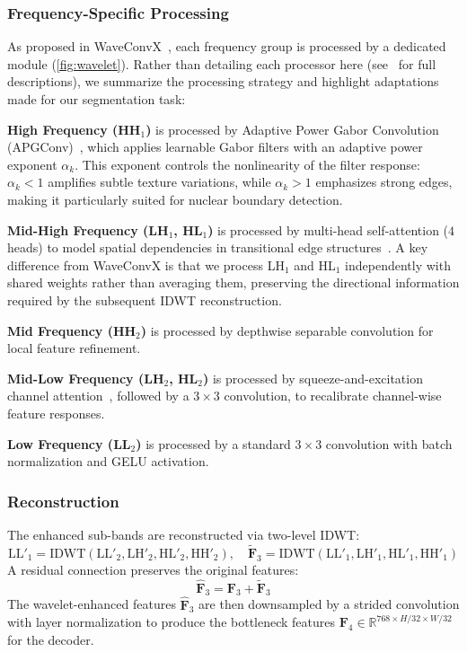 \documentclass[conference]{IEEEtran}
\begin{document}
\subsubsection{Frequency-Specific Processing}

As proposed in WaveConvX~\cite{waveconvx}, each frequency group is processed by a dedicated module (\cref{fig:wavelet}). Rather than detailing each processor here (see~\cite{waveconvx} for full descriptions), we summarize the processing strategy and highlight adaptations made for our segmentation task:

\textbf{High Frequency (HH$_1$)} is processed by Adaptive Power Gabor Convolution (APGConv)~\cite{waveconvx}, which applies learnable Gabor filters with an adaptive power exponent $\alpha_k$. This exponent controls the nonlinearity of the filter response: $\alpha_k < 1$ amplifies subtle texture variations, while $\alpha_k > 1$ emphasizes strong edges, making it particularly suited for nuclear boundary detection.

\textbf{Mid-High Frequency (LH$_1$, HL$_1$)} is processed by multi-head self-attention ($4$ heads) to model spatial dependencies in transitional edge structures~\cite{waveconvx}. A key difference from WaveConvX is that we process LH$_1$ and HL$_1$ independently with shared weights rather than averaging them, preserving the directional information required by the subsequent IDWT reconstruction.

\textbf{Mid Frequency (HH$_2$)} is processed by depthwise separable convolution for local feature refinement.

\textbf{Mid-Low Frequency (LH$_2$, HL$_2$)} is processed by squeeze-and-excitation channel attention~\cite{waveconvx}, followed by a $3{\times}3$ convolution, to recalibrate channel-wise feature responses.

\textbf{Low Frequency (LL$_2$)} is processed by a standard $3{\times}3$ convolution with batch normalization and GELU activation.

\subsubsection{Reconstruction}

The enhanced sub-bands are reconstructed via two-level IDWT:
\begin{equation}
    \text{LL}'_1 = \text{IDWT}(\text{LL}'_2, \text{LH}'_2, \text{HL}'_2, \text{HH}'_2), \quad
    \tilde{\mathbf{F}}_3 = \text{IDWT}(\text{LL}'_1, \text{LH}'_1, \text{HL}'_1, \text{HH}'_1)
\end{equation}
A residual connection preserves the original features:
\begin{equation}
    \hat{\mathbf{F}}_3 = \mathbf{F}_3 + \tilde{\mathbf{F}}_3
\end{equation}
The wavelet-enhanced features $\hat{\mathbf{F}}_3$ are then downsampled by a strided convolution with layer normalization to produce the bottleneck features $\mathbf{F}_4 \in \mathbb{R}^{768 \times H/32 \times W/32}$ for the decoder.
\end{document}

